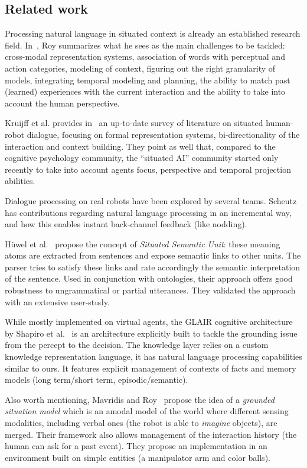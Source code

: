 \subsection{Related work}

Processing natural language in situated context is already an established
research field. In~\cite{Roy2005}, Roy summarizes what he sees as the main
challenges to be tackled: cross-modal representation systems, association of
words with perceptual and action categories, modeling of context, figuring out
the right granularity of models, integrating temporal modeling and planning,
the ability to match past (learned) experiences with the current interaction
and the ability to take into account the human perspective.

Kruijff et al. provides in~\cite{Kruijff2010} an up-to-date survey of literature
on situated human-robot dialogue, focusing on formal representation systems,
bi-directionality of the interaction and context building. They point as well
that, compared to the cognitive psychology community, the ``situated AI''
community started only recently to take into account agents focus, perspective and temporal
projection abilities.

Dialogue processing on real robots have been explored by several teams.
Scheutz~\cite{Brick2007} has contributions regarding natural language
processing in an incremental way, and how this enables instant back-channel
feedback (like nodding).

Hüwel et al.~\cite{Huwel2006} propose the concept of \textit{Situated Semantic
Unit}: these meaning atoms are extracted from sentences and expose semantic
links to other units. The parser tries to satisfy these links and rate
accordingly the semantic interpretation of the sentence. Used in conjunction
with ontologies, their approach offers good robustness to ungrammatical or
partial utterances. They validated the approach with an extensive user-study.

While mostly implemented on virtual agents, the GLAIR cognitive architecture
by Shapiro et al.~\cite{Shapiro2009} is an architecture
explicitly built to tackle the grounding issue from the percept to the
decision. The knowledge layer relies on a custom knowledge representation
language, it has natural language processing capabilities similar to ours. It
features explicit management of contexts of facts and memory models (long
term/short term, episodic/semantic).

Also worth mentioning, Mavridis and Roy~\cite{Mavridis2005} propose the idea of
a \emph{grounded situation model} which is an amodal model of the world where
different sensing modalities, including verbal ones (the robot is able to
\emph{imagine} objects), are merged. Their framework also allows management of
the interaction history (the human can ask for a past event). They propose an
implementation in an environment built on simple entities (a manipulator arm
and color balls).

